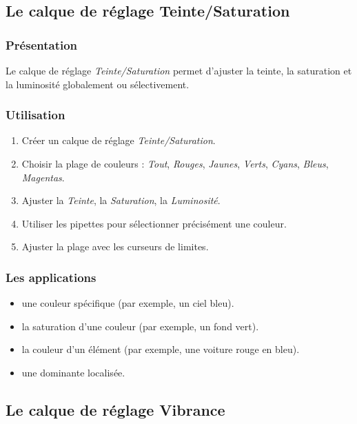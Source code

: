 \subsection{Le calque de réglage Teinte/Saturation}

\subsubsection{Présentation}

Le calque de réglage \emph{Teinte/Saturation} permet d'ajuster la teinte, la saturation et la luminosité globalement ou sélectivement.

\subsubsection{Utilisation}

\begin{enumerate}
    \item Créer un calque de réglage \emph{Teinte/Saturation}.
    \item Choisir la plage de couleurs : \emph{Tout}, \emph{Rouges}, \emph{Jaunes}, \emph{Verts}, \emph{Cyans}, \emph{Bleus}, \emph{Magentas}.
    \item Ajuster la \emph{Teinte}, la \emph{Saturation}, la \emph{Luminosité}.
    \item Utiliser les pipettes pour sélectionner précisément une couleur.
    \item Ajuster la plage avec les curseurs de limites.
\end{enumerate}

\subsubsection{Les applications}

\begin{itemize}
    \item {} une couleur spécifique (par exemple, un ciel bleu).
    \item {} la saturation d'une couleur (par exemple, un fond vert).
    \item {} la couleur d'un élément (par exemple, une voiture rouge en bleu).
    \item {} une dominante localisée.
\end{itemize}

\subsection{Le calque de réglage Vibrance}

